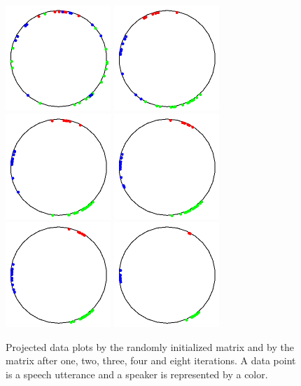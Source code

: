 \documentclass{techrep}
\begin{document}
\begin{figure}[H]
  \centering
  \includegraphics[width=150px]{draw0}
  \includegraphics[width=150px]{draw1}
  \includegraphics[width=150px]{draw2}
  \includegraphics[width=150px]{draw3}
  \includegraphics[width=150px]{draw4}
  \includegraphics[width=150px]{draw8}
  \caption{Projected data plots by the randomly initialized matrix and
    by the matrix after one, two, three, four and eight iterations. A
    data point is a speech utterance and a speaker is represented by a
    color.}
  \label{draws}
\end{figure}
\end{document}
